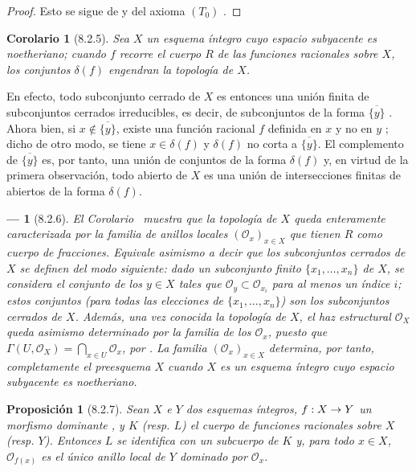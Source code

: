 \documentclass[oneside]{amsart}
\theoremstyle{ega-env-style}
\newtheorem*{env}{---}
\theoremstyle{ega-thm-env-style}
\newtheorem*{proposition}{Proposición}
\newtheorem*{corollary}{Corolario}
\theoremstyle{ega-defn-env-style}
\renewcommand{\to}{\mathchoice{\longrightarrow}{\rightarrow}{\rightarrow}{\rightarrow}}
\newcommand{\oldpage}[2][]{{\marginnote{\normalfont{\textbf{#1}~|~#2}}}\ignorespaces}
\let\EGAOriginalLabel\label
\renewcommand{\label}[1]{\phantomsection\EGAOriginalLabel{#1}}
\begin{document}
\oldpage[I]{167}
\begin{proof}
Esto se sigue de  y del axioma $(T_0)$ .
\end{proof}

\begin{corollary}[8.2.5]
\label{I.8.2.5}
Sea $X$ un esquema íntegro cuyo espacio subyacente es noetheriano;
cuando $f$ recorre el cuerpo $R$ de las funciones racionales sobre $X$, los conjuntos $\delta(f)$ engendran la topología de $X$.
\end{corollary}

En efecto, todo subconjunto cerrado de $X$ es entonces una unión finita de subconjuntos cerrados irreducibles, es decir, de subconjuntos de la forma $\overline{\{y\}}$ .
Ahora bien, si $x\notin\overline{\{y\}}$, existe una función racional $f$ definida en $x$ y no en $y$ ; dicho de otro modo, se tiene $x\in\delta(f)$ y $\delta(f)$ no corta a $\overline{\{y\}}$.
El complemento de $\overline{\{y\}}$ es, por tanto, una unión de conjuntos de la forma $\delta(f)$ y, en virtud de la primera observación, todo abierto de $X$ es una unión de intersecciones finitas de abiertos de la forma $\delta(f)$.

\begin{env}[8.2.6]
\label{I.8.2.6}
El Corolario~ muestra que la topología de $X$ queda enteramente caracterizada por la familia de anillos locales $(\mathscr{O}_x)_{x\in X}$ que tienen $R$ como cuerpo de fracciones.
Equivale asimismo a decir que los subconjuntos cerrados de $X$ se definen del modo siguiente: dado un subconjunto finito $\{x_1,\ldots,x_n\}$ de $X$, se considera el conjunto de los $y\in X$ tales que $\mathscr{O}_y\subset\mathscr{O}_{x_i}$ para al menos un índice $i$; estos conjuntos (para todas las elecciones de $\{x_1,\ldots,x_n\}$) son los subconjuntos cerrados de $X$.
Además, una vez conocida la topología de $X$, el haz estructural $\mathscr{O}_X$ queda asimismo determinado por la familia de los $\mathscr{O}_x$, puesto que $\Gamma(U,\mathscr{O}_X)=\bigcap_{x\in U}\mathscr{O}_x$, por .
La familia $(\mathscr{O}_x)_{x\in X}$ determina, por tanto, completamente el preesquema $X$ cuando $X$ es un esquema íntegro cuyo espacio subyacente es noetheriano.
\end{env}

\begin{proposition}[8.2.7]
\label{I.8.2.7}
Sean $X$ e $Y$ dos esquemas íntegros, $f:X\to Y$ un morfismo dominante , y $K$ \textup{(resp. $L$)} el cuerpo de funciones racionales sobre $X$ \textup{(resp. $Y$)}.
Entonces $L$ se identifica con un subcuerpo de $K$ y, para todo $x\in X$, $\mathscr{O}_{f(x)}$ es el único anillo local de $Y$ dominado por $\mathscr{O}_x$.
\end{proposition}
\end{document}
